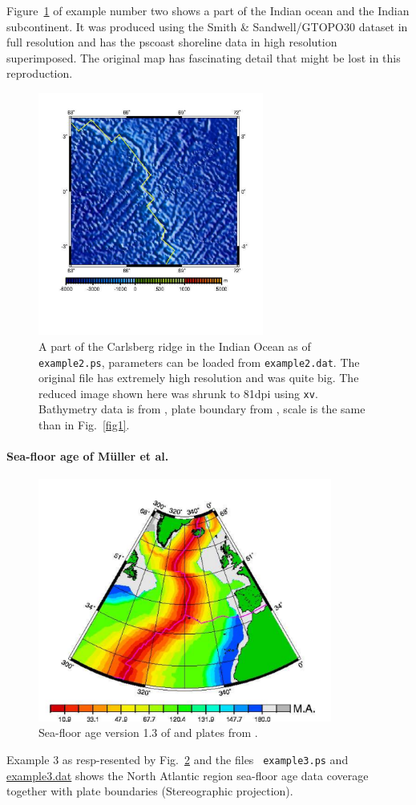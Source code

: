 \documentclass[11pt]{article}
\begin{document}
Figure~\ref{fig2} of example number two shows a part of the Indian
ocean and the Indian subcontinent. It was produced using the Smith \&
Sandwell/GTOPO30 dataset in full resolution and has the pscoast
shoreline data in high resolution superimposed. The original map has
fascinating detail that might be lost in this reproduction.
\begin{figure}
\centerline{\includegraphics[height=8cm]{./examples/example2}}
\caption{A part of the Carlsberg ridge in the Indian Ocean as of 
  {\tt example2.ps},
  parameters can be loaded from {\tt example2.dat}. The original file
  has extremely high resolution and was quite big. The reduced
  image shown here was shrunk to 81dpi using {\tt xv}. Bathymetry data
  is from \cite{smith97}, plate boundary from \cite{demets90},
  scale is the same than in Fig.~\ref{fig1}. \label{fig2}}
\end{figure}


\paragraph{Sea-floor age of M{\"{u}}ller et al.}
\begin{figure}
\centerline{\includegraphics[height=8cm]{./examples/example3}}
\caption{Sea-floor age version 1.3 of \cite{mueller97} and plates from
  \cite{demets90}.\label{fig3}} 
\end{figure}
Example 3 as resp-resented by Fig.~\ref{fig3} and the files {\tt
  example3.ps} and \url{example3.dat} shows the North Atlantic region
sea-floor age data coverage together with plate boundaries
(Stereographic projection).
\end{document}

